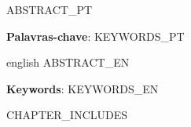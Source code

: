 \documentclass[
  12pt,
  openright,
  oneside,
  a4paper,
  chapter=TITLE,
  section=TITLE,
  english,         %
  {{LANGUAGE_BABEL}}  %
]{abntex2}
\begin{document}
\frenchspacing

\pretextual
\imprimircapa
\imprimirfolhaderosto*

% 
% 
% 
% 
% 

\begin{resumo}
  {{ABSTRACT_PT}}

  \textbf{Palavras-chave}: {{KEYWORDS_PT}}
\end{resumo}

\begin{resumo}[Abstract]
  \begin{otherlanguage*}{english}
    {{ABSTRACT_EN}}

    \textbf{Keywords}: {{KEYWORDS_EN}}
  \end{otherlanguage*}
\end{resumo}

\listoffigures*
\cleardoublepage
{}
\listoftables*
\cleardoublepage

\tableofcontents*
\cleardoublepage

\textual
{{CHAPTER_INCLUDES}}

\postextual
\printbibliography[title={Refer\^encias}]

%   
%   
\end{document}
